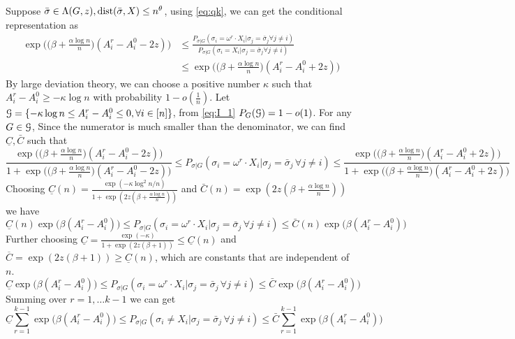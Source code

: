 \documentclass{article}
\begin{document}
\begin{remark}
	Suppose $\bar{\sigma}\in \Lambda(G,z) ,\operatorname{dist}(\bar{\sigma}, X) \le n^{\theta} $,
	using \eqref{eq:qk}, we can get the conditional representation as
	\begin{align*}
	\exp\Big(\big(\beta+\frac{\alpha\log n}{n} \big) (A^r_i-A^0_i - 2z) \Big) & \le
	\frac{P_{\sigma|G}(\sigma_i= \omega^r \cdot X_i | \sigma_j = \bar{\sigma}_j \forall j \neq i  )}
	{P_{\sigma|G}(\sigma_i= X_i | \sigma_j = \bar{\sigma}_j \forall j \neq i  )}
	\\
	& \le \exp\Big(\big(\beta+\frac{\alpha\log n}{n} \big) (A^r_i-A^0_i + 2z) \Big)
	\end{align*}
	By large deviation theory, we can choose a positive number $\kappa$ such that $A_i^r - A_i^0 \geq -\kappa \log n$ with probability $1-o(\frac{1}{n})$.
	Let $\mathcal{G} = \{ -\kappa \log n\leq A_i^r - A_i^0 \leq 0,\forall i \in[n] \}$, from \eqref{eq:I_1} $P_G(\mathcal{G}) = 1-o(1)$.
	For any $G\in \mathcal{G}$,
	Since the numerator is much smaller than the denominator, we can find $\underline{C}, \bar{C}$ such that
	\begin{equation}\label{eq:swX}
	\frac{\exp\Big(\big(\beta+\frac{\alpha\log n}{n} \big) (A^r_i-A^0_i - 2z) \Big) }{1 + \exp\Big(\big(\beta+\frac{\alpha\log n}{n} \big) (A^r_i-A^0_i - 2z) \Big) } \le 
	P_{\sigma|G}(\sigma_i = \omega^r \cdot X_i | \sigma_j = \bar{\sigma}_j \,\forall j \neq i )
	\le \frac{\exp\Big(\big(\beta+\frac{\alpha\log n}{n} \big) (A^r_i-A^0_i + 2z) \Big) }{1 + \exp\Big(\big(\beta+\frac{\alpha\log n}{n} \big) (A^r_i-A^0_i + 2z) \Big) } 
	\end{equation}
	Choosing $\underline{C}(n)=\frac{\exp(-\kappa \log^2 n/n)}{1+\exp(2z(\beta+\frac{\alpha \log n}{n}))}$ and $\bar{C}(n)=\exp(2z(\beta+\frac{\alpha \log n}{n}))$
	we have
	$$
\underline{C}(n)\exp\Big(\beta(A^r_i-A^0_i) \Big)  \le 
P_{\sigma|G}(\sigma_i = \omega^r \cdot X_i | \sigma_j = \bar{\sigma}_j \,\forall j \neq i )
 \leq \bar{C}(n) \exp\Big(\beta (A^r_i-A^0_i ) \Big) 
	$$
	Further choosing $\underline{C}=\frac{\exp(-\kappa)}{1+\exp(2z(\beta+1))} \leq \underline{C}(n)$ and $\overline{C}=\exp(2z(\beta+1)) \geq \underline{C}(n)$,
	which are constants that are independent of $n$.
	\begin{equation}\label{eq:single_sigma}
	\underline{C}\exp\Big(\beta(A^r_i-A^0_i) \Big)  \le 
	P_{\sigma|G}(\sigma_i = \omega^r \cdot X_i | \sigma_j = \bar{\sigma}_j \,\forall j \neq i )
	\leq \bar{C} \exp\Big(\beta (A^r_i-A^0_i ) \Big) 
	\end{equation}
	Summing over $r=1, \dots k-1$ we can get
	\begin{equation} \label{eq:qke}
	\underline{C}\sum_{r=1}^{k-1}\exp\Big(\beta(A^r_i-A^0_i) \Big)  \le 
	P_{\sigma|G}(\sigma_i \neq  X_i | \sigma_j = \bar{\sigma}_j \,\forall j \neq i )
	\le \bar{C} \sum_{r=1}^{k-1}\exp\Big(\beta (A^r_i-A^0_i ) \Big) 
	\end{equation}

\end{remark}
\end{document}
